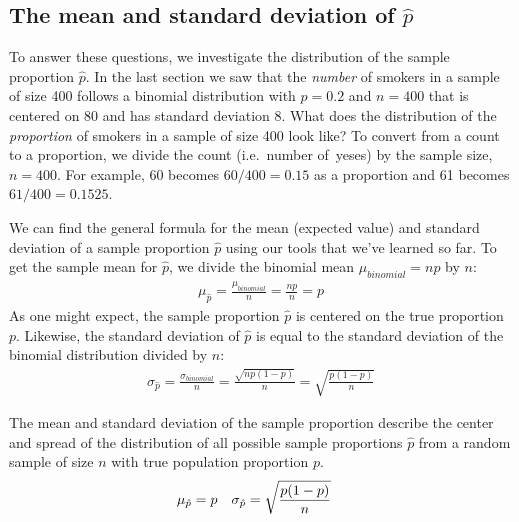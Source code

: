 \subsection{The mean and standard deviation of $\hat{p}$}

To answer these questions, we investigate the distribution of the sample proportion $\hat{p}$. In the last section we saw that the \emph{number} of smokers in a sample of size 400 follows a binomial distribution with $p=0.2$ and $n=400$ that is centered on 80 and has standard deviation 8. What does the distribution of the \emph{proportion} of smokers in a sample of size 400 look like?  To convert from a count to a proportion, we divide the count (i.e.~number of~yeses) by the sample size, $n = 400$. For example, 60 becomes $60/400 = 0.15$ as a proportion and 61 becomes $61/400 = 0.1525$. 

We can find the general formula for the mean (expected value) and standard deviation of a sample proportion $\hat{p}$ using our tools that we've learned so far. To get the sample mean for $\hat{p}$, we divide the binomial mean $\mu_{binomial} = np$ by $n$:
\begin{align*}
\mu_{\hat{p}} = \frac{\mu_{binomial}}{n} = \frac{np}{n} = p
\end{align*}
As one might expect, the sample proportion $\hat{p}$ is centered on the true proportion $p$. Likewise, the standard deviation of $\hat{p}$ is equal to the standard deviation of the binomial distribution divided by $n$:
\begin{align*}
\sigma_{\hat{p}}
	= \frac{\sigma_{binomial}}{n}
	= \frac{\sqrt{np(1-p)}}{n}
	= \sqrt{\frac{p(1-p)}{n}}
\end{align*}

\begin{termBox}{
The mean and standard deviation of the sample proportion describe the center and spread of the distribution of all possible sample proportions $\hat{p}$ from a random sample of size $n$ with true population proportion $p$.
\begin{align*}
\mu_{\hat{p}} &= p
	& \sigma_{\hat{p}}&= \sqrt{\frac{p(1-p)}{n}}
	\vspace{1mm}
\end{align*}}
\end{termBox}


